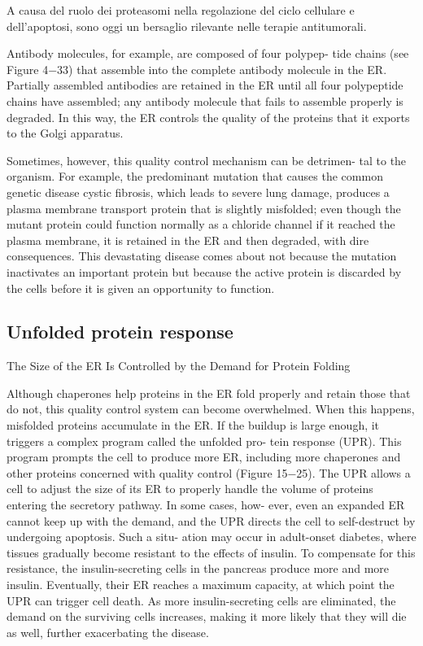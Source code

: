 A causa del ruolo dei proteasomi nella regolazione del ciclo cellulare e dell'apoptosi, sono oggi un bersaglio rilevante nelle terapie antitumorali. 

Antibody molecules, for example, are composed of four polypep-
tide chains (see Figure 4−33) that assemble into the complete antibody
molecule in the ER. Partially assembled antibodies are retained in the ER
until all four polypeptide chains have assembled; any antibody molecule
that fails to assemble properly is degraded. In this way, the ER controls
the quality of the proteins that it exports to the Golgi apparatus.

Sometimes, however, this quality control mechanism can be detrimen-
tal to the organism. For example, the predominant mutation that causes
the common genetic disease cystic fibrosis, which leads to severe lung
damage, produces a plasma membrane transport protein that is slightly
misfolded; even though the mutant protein could function normally as a
chloride channel if it reached the plasma membrane, it is retained in the
ER and then degraded, with dire consequences. This devastating disease
comes about not because the mutation inactivates an important protein
but because the active protein is discarded by the cells before it is given
an opportunity to function.


\subsection{Unfolded protein response}
The Size of the ER Is Controlled by the Demand for Protein Folding

Although chaperones help proteins in the ER fold properly and retain those
that do not, this quality control system can become overwhelmed. When
this happens, misfolded proteins accumulate in the ER. If the buildup is
large enough, it triggers a complex program called the unfolded pro-
tein response (UPR). This program prompts the cell to produce more ER,
including more chaperones and other proteins concerned with quality
control (Figure 15−25).
The UPR allows a cell to adjust the size of its ER to properly handle the
volume of proteins entering the secretory pathway. In some cases, how-
ever, even an expanded ER cannot keep up with the demand, and the
UPR directs the cell to self-destruct by undergoing apoptosis. Such a situ-
ation may occur in adult-onset diabetes, where tissues gradually become
resistant to the effects of insulin. To compensate for this resistance, the
insulin-secreting cells in the pancreas produce more and more insulin.
Eventually, their ER reaches a maximum capacity, at which point the UPR
can trigger cell death. As more insulin-secreting cells are eliminated, the
demand on the surviving cells increases, making it more likely that they
will die as well, further exacerbating the disease.

